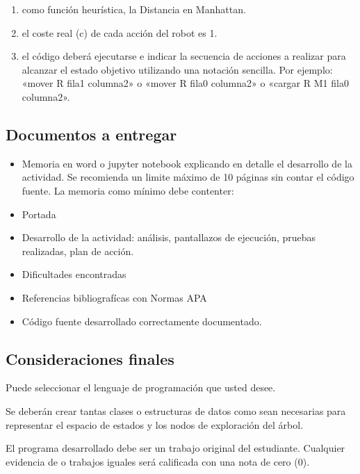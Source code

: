 \documentclass[11pt]{article}
\providecommand{\tightlist}{%
      \setlength{\itemsep}{0pt}\setlength{\parskip}{0pt}}
\begin{document}
\begin{enumerate}
\def\labelenumi{\arabic{enumi}.}
\tightlist
\item
  como función heurística, la Distancia en Manhattan.
\item
  el coste real (c) de cada acción del robot es 1.
\item
  el código deberá ejecutarse e indicar la secuencia de acciones a
  realizar para alcanzar el estado objetivo utilizando una notación
  sencilla. Por ejemplo: «mover R fila1 columna2» o «mover R fila0
  columna2» o «cargar R M1 fila0 columna2».
\end{enumerate}

\hypertarget{documentos-a-entregar}{%
\subsection{Documentos a entregar}\label{documentos-a-entregar}}

\begin{itemize}
\item
  Memoria en word o jupyter notebook explicando en detalle el desarrollo
  de la actividad. Se recomienda un limite máximo de 10 páginas sin
  contar el código fuente. La memoria como mínimo debe contenter:
\item
  Portada
\item
  Desarrollo de la actividad: análisis, pantallazos de ejecución,
  pruebas realizadas, plan de acción.
\item
  Dificultades encontradas
\item
  Referencias bibliografícas con Normas APA
\item
  Código fuente desarrollado correctamente documentado.
\end{itemize}

\hypertarget{consideraciones-finales}{%
\subsection{Consideraciones finales}\label{consideraciones-finales}}

Puede seleccionar el lenguaje de programación que usted desee.

Se deberán crear tantas clases o estructuras de datos como sean
necesarias para representar el espacio de estados y los nodos de
exploración del árbol.

El programa desarrollado debe ser un trabajo original del estudiante.
Cualquier evidencia de o trabajos iguales será calificada con una nota
de cero (0).
\end{document}
